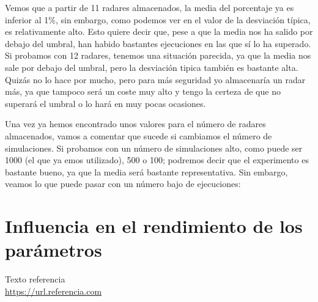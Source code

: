 \documentclass[11pt,a4paper]{report}
\begin{document}
Vemos que a partir de 11 radares almacenados, la media del porcentaje ya es inferior al 1\%, sin embargo, como podemos ver en el valor de
la desviación típica, es relativamente alto. Esto quiere decir que, pese a que la media nos ha salido por debajo del umbral, han habido
bastantes ejecuciones en las que sí lo ha superado. Si probamos con 12 radares, tenemos una situación parecida, ya que la media nos sale
por debajo del umbral, pero la desviación tipica también es bastante alta. Quizás no lo hace por mucho, pero para más seguridad yo
almacenaría un radar más, ya que tampoco será un coste muy alto y tengo la certeza de que no superará el umbral o  lo hará en muy pocas
ocasiones.

Una vez ya hemos encontrado unos valores para el número de radares almacenados, vamos a comentar que sucede si cambiamos el número
de simulaciones. Si probamos con un número de simulaciones alto, como puede ser 1000 (el que ya emos utilizado), 500 o 100; podremos
decir que el experimento es bastante bueno, ya que la media será bastante representativa. Sin embargo, veamos lo que puede pasar con un
número bajo de ejecuciones:



\section{Influencia en el rendimiento de los parámetros}



\newpage

\begin{thebibliography}{5}

Texto referencia
\\\url{https://url.referencia.com}

\end{thebibliography}
\end{document}
